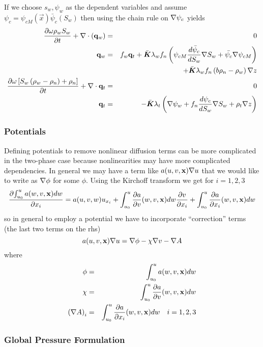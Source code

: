 \documentclass[10pt,dvips,twoside,reqno]{amsart}
\begin{document}
If we choose $s_w, \psi_w$ as the dependent variables and assume
$\psi_c = \psi_{cM}(\vec x) \bar{\psi}_c(S_w)$ then using the chain
rule on $\nabla \psi_c$ yields
\begin{eqnarray}
\frac{\partial {\omega \rho_w S_w}}{\partial {t}} + \nabla \cdot ({\bf q}_w) &=& 0 \\
{\bf q}_w &=&  f_w {\bf q}_t + \bar{\mbox{{\boldmath ${K}$}}} \lambda_w f_n \left( \psi_{cM} \frac{d {\bar{\psi}_c}}{d {S_w}} \nabla S_w + \bar{\psi_c} \nabla \psi_{cM} \right) \\
&& + \bar{\mbox{{\boldmath ${K}$}}} \lambda_w f_n \left(  b \rho_n -\rho_w \right) \nabla z \\
\frac{\partial {\omega \left[S_w \left(\rho_w - \rho_n \right)+ \rho_n \right]}}{\partial {t}} + \nabla \cdot {\bf q}_t &=& 0 \\
{\bf q}_t  &=& - \bar{\mbox{{\boldmath ${K}$}}} \lambda_t \left( \nabla \psi_w + f_n \frac{d {\psi_c}}{d {S_w}} \nabla S_w + \rho_t \nabla z \right) 
\end{eqnarray}

\subsubsection{Potentials}

Defining potentials to remove nonlinear diffusion terms can be more
complicated in the two-phase case because nonlinearities may have more
complicated dependencies. In general we may have a term like
$a(u,v,{\bf x}) \nabla u$ that we would like to write as $\nabla \phi$
for some $\phi$. Using the Kirchoff transform we get for $i=1,2,3$
\begin{equation}
  \label{eq:kirchmp}
  \frac{\partial {\int_{u_0}^{u} a(w,v,{\bf x}) dw}}{\partial {x_i}} = a(u,v,w) u_{x_{i}} + \int_{u_0}^{u} \frac{\partial {a}}{\partial {v}}(w,v,{\bf x}) dw \frac{\partial {v}}{\partial {x_i}} + \int_{u_0}^{u} \frac{\partial {a}}{\partial {x_i}}(w,v,{\bf x}) dw
\end{equation}
so in general to employ a potential we have to incorporate
``correction'' terms (the last two terms on the rhs)
\begin{equation}
  \label{eq:kirchgen}
  a(u,v,{\bf x}) \nabla u = \nabla \phi - \chi \nabla v - \nabla A
\end{equation}
where
\begin{eqnarray}
  \label{eq:kirchdeff}
  \phi &=& \int_{u_0}^{u} a(w,v,{\bf x}) dw \\
  \chi  &=& \int_{u_0}^{u} \frac{\partial {a}}{\partial {v}}(w,v,{\bf x}) dw \\
  \left( \nabla A \right)_i &=&  \int_{u_0}^{u} \frac{\partial {a}}{\partial {x_i}}(w,v,{\bf x}) dw \quad i=1,2,3
\end{eqnarray}

\subsubsection{Global Pressure Formulation}
\end{document}

